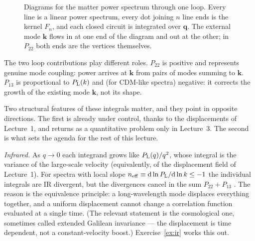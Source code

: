 \documentclass[a4paper,11pt]{article}
\newcommand{\vq}{\bm{q}}
\newcommand{\vk}{\bm{k}}
\def\Plin{P_{\rm L}}
\newcommand{\dd}{\mathrm{d}}
\numberwithin{equation}{section}
\begin{document}
\begin{figure}[t]
\centering
{}
\caption{Diagrams for the matter power spectrum through one loop. Every line is a linear power spectrum, every dot joining $n$ line ends is the kernel $F_n$, and each closed circuit is integrated over $\vq$. The external mode $\vk$ flows in at one end of the diagram and out at the other; in $P_{22}$ both ends are the vertices themselves.}
\label{fig:loops}
\end{figure}

The two loop contributions play different roles. $P_{22}$ is positive and represents genuine mode coupling: power arrives at $\vk$ from pairs of modes summing to $\vk$. $P_{13}$ is proportional to $\Plin(k)$ and (for CDM-like spectra) negative: it corrects the growth of the existing mode $\vk$, not its shape.

Two structural features of these integrals matter, and they point in opposite directions. The first is already under control, thanks to the displacements of Lecture~1, and returns as a quantitative problem only in Lecture~3. The second is what sets the agenda for the rest of this lecture.

\emph{Infrared.} As $q\to0$ each integrand grows like $\Plin(q)/q^2$, whose integral is the variance of the large-scale velocity (equivalently, of the displacement field of Lecture~1). For spectra with local slope $n_{\rm eff} \equiv \dd\ln\Plin/\dd\ln k \le -1$ the individual integrals are IR divergent, but the divergences cancel in the sum $P_{22}+P_{13}$ \cite[\S 4.2.2]{Bernardeau2002}. The reason is the equivalence principle: a long-wavelength mode displaces everything together, and a uniform displacement cannot change a correlation function evaluated at a single time. (The relevant statement is the cosmological one, sometimes called extended Galilean invariance --- the displacement is time dependent, not a constant-velocity boost.) Exercise~\ref{ex:ir} works this out.
\end{document}
